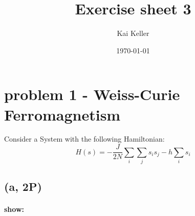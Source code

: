 \documentclass[a4paper]{article}
\title{Exercise sheet 3}
\author{Kai Keller}
\date{\today}
\begin{document}
\maketitle
\tableofcontents

\section{problem 1 - Weiss-Curie Ferromagnetism}
Consider a System with the following Hamiltonian:
\begin{equation}
    H(s)=-\frac{J}{2N}\sum_i\sum_j s_i s_j -h\sum_i s_i \label{wchamiltonian}
\end{equation}

\subsection{(a, 2P)}
\paragraph{show:}
\end{document}
